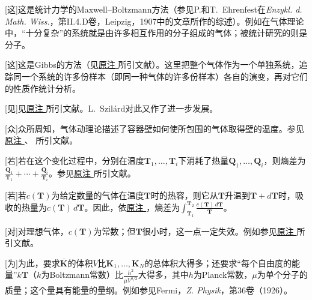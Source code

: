 \documentclass[fontsize=13pt,twoside,openany,headings=normal,parskip=false,bookmarkpackage=false,DIV=calc]{scrbook}
\begin{document}
[这]{这是统计力学的Maxwell--Boltzmann方法（参见P.和T.~Ehrenfest在\emph{Enzykl. d. Math. Wiss.}，第II.4.D卷，Leipzig，1907中的文章所作的综述）。例如在气体理论中，“十分复杂”的系统就是由许多相互作用的分子组成的气体；被统计研究的则是分子。}

[这]{这是Gibbs的方法（见\CJKglue \hyperlink{note-185}{原注 } 所引文献）。这里把整个气体作为一个单独系统，追踪同一个系统的许多份样本（即同一种气体的许多份样本）各自的演变，再对它们的性质作统计分析。}

[见]{见\CJKglue \hyperlink{note-184}{原注 } 所引文献。L.~Szilárd对此又作了进一步发展。}

[众]{众所周知，气体动理论描述了容器壁如何使所包围的气体取得壁的温度。参见\CJKglue \hyperlink{note-184}{原注 }、\hyperlink{note-185}{} 所引文献。}

[若]{若在这个变化过程中，分别在温度$\mathbf{T}_1,\allowbreak \ldots,\allowbreak \mathbf{T}_i$下消耗了热量$\mathbf{Q}_1,\allowbreak \ldots,\allowbreak \mathbf{Q}_i$，则熵差为$\frac{\mathbf{Q}_1}{\mathbf{T}_1}+\cdots+\frac{\mathbf{Q}_i}{\mathbf{T}_i}$。参见\CJKglue \hyperlink{note-184}{原注 } 所引文献。}

[若]{\hypertarget{origpage-260}{}\label{origpage-260}若$c(\mathbf T)$为给定数量的气体在温度$\mathbf T$时的热容，则它从$\mathbf T$升温到$\mathbf T+d\mathbf T$时，吸收的热量为$c(\mathbf T)\,d\mathbf T$。因此，依\CJKglue \hyperlink{note-186}{原注 }，熵差为$\int_{\mathbf T_1}^{\mathbf T_2}\frac{c(\mathbf T)\,d\mathbf T}{\mathbf T}$。}

[对]{对理想气体，$c(\mathbf T)$为常数；但$\mathbf T$很小时，这一点一定失效。例如参见\CJKglue \hyperlink{note-6}{原注 } 所引文献。}

[为]{为此，要求$\overline{\boldsymbol K}$的体积$V$比$\boldsymbol K_1,\allowbreak \ldots,\allowbreak \boldsymbol K_N$的总体积大得多；还要求“每个自由度的能量”$k\mathbf T$（$k$为Boltzmann常数）比$\frac{h^2}{\mu V^{2/3}}$大得多，其中$h$为Planck常数，$\mu$为单个分子的质量；这个量具有能量的量纲。例如参见Fermi，\emph{Z. Physik}，第36卷（1926）。}
\end{document}
